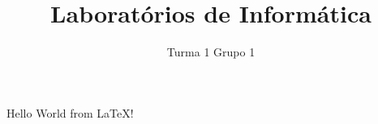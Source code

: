 \documentclass[11pt,openright,twoside]{report}
\title{\textbf{Laboratórios de Informática}}
\author{Turma 1 Grupo 1}
\date{}
\begin{document}
\maketitle
Hello World from \LaTeX!
\end{document}
